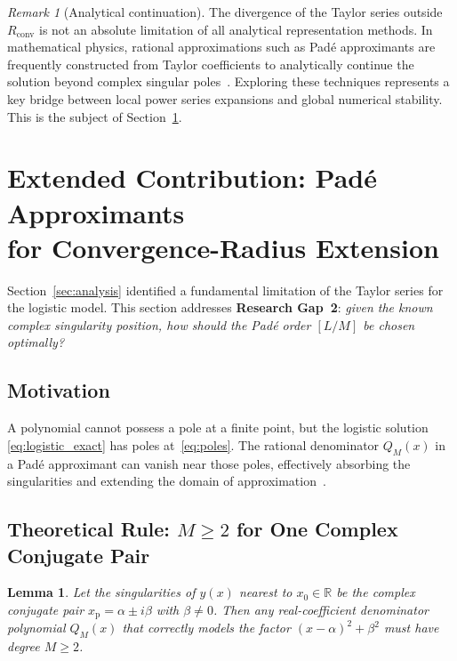 \documentclass[12pt,a4paper]{article}
\newtheorem{lemma}[theorem]{Lemma}
\theoremstyle{definition}
\theoremstyle{remark}
\newtheorem{remark}[theorem]{Remark}
\newcommand{\R}{\mathbb{R}}
\newcommand{\Rconv}{R_{\mathrm{conv}}}
\newcommand{\xp}{x_{\mathrm{p}}}
\begin{document}
\begin{remark}[Analytical continuation]
  The divergence of the Taylor series outside $\Rconv$ is not an
  absolute limitation of all analytical representation methods.  In
  mathematical physics, rational approximations such as Padé
  approximants are frequently constructed from Taylor coefficients to
  analytically continue the solution beyond complex singular
  poles~\cite{baker1996}.  Exploring these techniques represents a
  key bridge between local power series expansions and global
  numerical stability.  This is the subject of
  Section~\ref{sec:pade}.
\end{remark}

\section{Extended Contribution: Padé Approximants\texorpdfstring{\\}{ }for Convergence-Radius Extension}
\label{sec:pade}

Section~\ref{sec:analysis} identified a fundamental limitation of the
Taylor series for the logistic model.  This section addresses
\textbf{Research Gap~2}: \emph{given the known complex singularity
position, how should the Padé order $[L/M]$ be chosen optimally?}

\subsection{Motivation}

A polynomial cannot possess a pole at a finite point, but the
logistic solution \eqref{eq:logistic_exact} has poles
at~\eqref{eq:poles}.  The rational denominator $Q_M(x)$ in a Padé
approximant can vanish near those poles, effectively absorbing the
singularities and extending the domain of
approximation~\cite{baker1996}.

\subsection{Theoretical Rule: \texorpdfstring{$M \geq 2$}{M >= 2} for One Complex Conjugate Pair}
\label{sec:m_rule}

\begin{lemma}
  \label{prop:m2}
  Let the singularities of $y(x)$ nearest to $x_0 \in \R$ be the
  complex conjugate pair $\xp = \alpha \pm i\beta$
  with $\beta \neq 0$.  Then any real-coefficient denominator
  polynomial $Q_M(x)$ that correctly models the factor
  $(x - \alpha)^2 + \beta^2$ must have degree $M \geq 2$.
\end{lemma}
\end{document}
